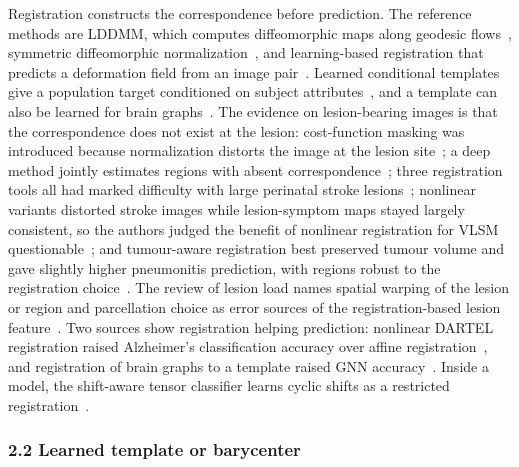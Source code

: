 \documentclass[journal,onecolumn]{IEEEtran}
\begin{document}
Registration constructs the correspondence before prediction. The reference methods are LDDMM, which computes diffeomorphic maps along geodesic flows~\cite{Beg2005Computing}, symmetric diffeomorphic normalization~\cite{Avants2008Symmetric}, and learning-based registration that predicts a deformation field from an image pair~\cite{Balakrishnan2019VoxelMorph}. Learned conditional templates give a population target conditioned on subject attributes~\cite{Rakic2026AtlasMorph}, and a template can also be learned for brain graphs~\cite{Gurler2023Template}. The evidence on lesion-bearing images is that the correspondence does not exist at the lesion: cost-function masking was introduced because normalization distorts the image at the lesion site~\cite{Brett2001Spatial}; a deep method jointly estimates regions with absent correspondence~\cite{Mok2022Unsupervised}; three registration tools all had marked difficulty with large perinatal stroke lesions~\cite{Miller2025Comparison}; nonlinear variants distorted stroke images while lesion-symptom maps stayed largely consistent, so the authors judged the benefit of nonlinear registration for VLSM questionable~\cite{Juhling2024Spatial}; and tumour-aware registration best preserved tumour volume and gave slightly higher pneumonitis prediction, with regions robust to the registration choice~\cite{Choi2026Tumor}. The review of lesion load names spatial warping of the lesion or region and parcellation choice as error sources of the registration-based lesion feature~\cite{Seghier2023Elusive}. Two sources show registration helping prediction: nonlinear DARTEL registration raised Alzheimer's classification accuracy over affine registration~\cite{Fujibayashi2021Nonlinear}, and registration of brain graphs to a template raised GNN accuracy~\cite{Gurler2023Template}. Inside a model, the shift-aware tensor classifier learns cyclic shifts as a restricted registration~\cite{Huang2026ShiftAware}.

\subsubsection{2.2 Learned template or barycenter}
\end{document}
